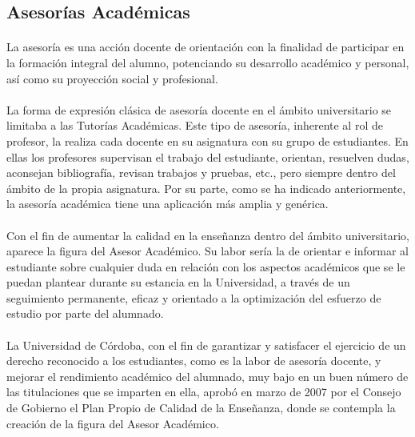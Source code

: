\subsection{Asesorías Académicas}

\paragraph{}La asesoría es una acción docente de orientación con la finalidad de
participar en la formación integral del alumno, potenciando su desarrollo
académico y personal, así como su proyección social y profesional.

\paragraph{}La forma de expresión clásica de asesoría docente en el ámbito
universitario se limitaba a las Tutorías Académicas. Este tipo de asesoría,
inherente al rol de profesor, la realiza cada docente en su asignatura con su
grupo de estudiantes. En ellas los profesores supervisan el trabajo del
estudiante, orientan, resuelven dudas, aconsejan bibliografía, revisan trabajos
y pruebas, etc., pero siempre dentro del ámbito de la propia asignatura. Por su
parte, como se ha indicado anteriormente, la asesoría académica tiene una
aplicación más amplia y genérica.

\paragraph{}Con el fin de aumentar la calidad en la enseñanza dentro del ámbito
universitario, aparece la figura del Asesor Académico. Su labor sería la
de orientar e informar al estudiante sobre cualquier duda en relación con los
aspectos académicos que se le puedan plantear durante su estancia en la
Universidad, a través de un seguimiento permanente, eficaz y orientado a la
optimización del esfuerzo de estudio por parte del alumnado.

\paragraph{}La Universidad de Córdoba, con el fin de garantizar y satisfacer el
ejercicio de un derecho reconocido a los estudiantes, como es la labor de
asesoría docente, y mejorar el rendimiento académico del alumnado, muy bajo en
un buen número de las titulaciones que se imparten en ella, aprobó en marzo de
2007 por el Consejo de Gobierno el Plan Propio de Calidad de la Enseñanza, donde
se contempla la creación de la figura del Asesor Académico.

